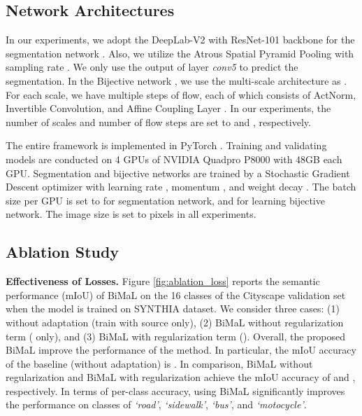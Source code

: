 \documentclass[10pt,twocolumn,letterpaper]{article}
\begin{document}
\subsection{Network Architectures}

In our experiments, we adopt the DeepLab-V2 \cite{chen2018deeplab} with ResNet-101 \cite{He2015} backbone for the segmentation network . Also, we utilize the Atrous Spatial Pyramid Pooling with sampling rate . We only use the output of layer \textit{conv5} to predict the segmentation.
In the Bijective network , we use the multi-scale architecture as \cite{dinh2015nice, dinh2017density, duong2019learning, glow, Duong_2017_ICCV}. For each scale, we have multiple steps of flow, each of which consists of ActNorm, Invertible  Convolution, and Affine Coupling Layer \cite{glow, 9108692}. In our experiments, the number of scales and number of flow steps are set to  and , respectively. 

The entire framework is implemented in PyTorch \cite{paszke2019pytorch}. Training and validating models are conducted on 4 GPUs of NVIDIA Quadpro P8000 with 48GB each GPU. Segmentation and bijective networks are trained by a Stochastic Gradient Descent optimizer \cite{bottou2010large} with learning rate , momentum , and weight decay . The batch size per GPU is set to  for segmentation network, and  for learning bijective network. 
The image size is set to  pixels in all experiments.




\subsection{Ablation Study}

\textbf{Effectiveness of Losses.} Figure \ref{fig:ablation_loss} reports the semantic performance (mIoU) of BiMaL on the 16 classes of the Cityscape validation set when the model is trained on \mbox{SYNTHIA} dataset. We consider three cases: (1) without adaptation (train with source only), (2) BiMaL without regularization term ( only), and (3) BiMaL with regularization term (). Overall, the proposed BiMaL improve the performance of the method. In particular, the mIoU accuracy of the baseline (without adaptation) is . 
In comparison, BiMaL without regularization and BiMaL with regularization achieve the mIoU accuracy of  and , respectively. 
In terms of per-class accuracy, using BiMaL significantly improves the performance on classes of \textit{`road'}, \textit{`sidewalk'}, \textit{`bus'}, and \textit{`motocycle'}.
\end{document}
